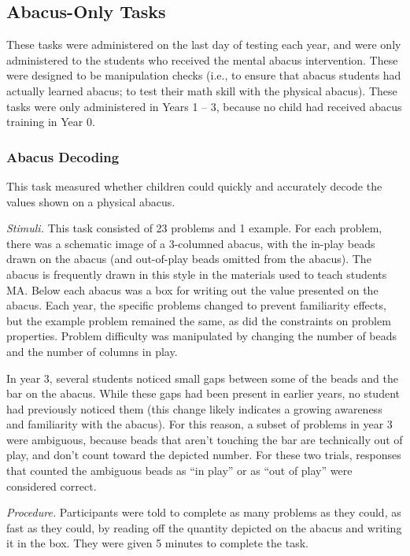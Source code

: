 \documentclass[11pt]{article}
\begin{document}
\subsection{Abacus-Only Tasks}

These tasks were administered on the last day of testing each year, and were only administered to the students who received the mental abacus intervention. These were designed to be manipulation checks (i.e., to ensure that abacus students had actually learned abacus; to test their math skill with the physical abacus). These tasks were only administered in Years 1 -- 3, because no child had received abacus training in Year 0.

\subsubsection{Abacus Decoding}

This task measured whether children could quickly and accurately decode the values shown on a physical abacus.

{\it Stimuli.} This task consisted of 23 problems and 1 example. For each problem, there was a schematic image of a 3-columned abacus, with the in-play beads drawn on the abacus (and out-of-play beads omitted from the abacus). The abacus is frequently drawn in this style in the materials used to teach students MA. Below each abacus was a box for writing out the value presented on the abacus. Each year, the specific problems changed to prevent familiarity effects, but the example problem remained the same, as did the constraints on problem properties. Problem difficulty was manipulated by changing the number of beads and the number of columns in play.

In year 3, several students noticed small gaps between some of the beads and the bar on the abacus. While these gaps had been present in earlier years, no student had previously noticed them (this change likely indicates a growing awareness and familiarity with the abacus). For this reason, a subset of problems in year 3 were ambiguous, because beads that aren't touching the bar are technically out of play, and don't count toward the depicted number. For these two trials, responses that counted the ambiguous beads as ``in play'' or as ``out of play'' were considered correct.

{\it Procedure.} Participants were told to complete as many problems as they could, as fast as they could, by reading off the quantity depicted on the abacus and writing it in the box. They were given 5 minutes to complete the task.
\end{document}

